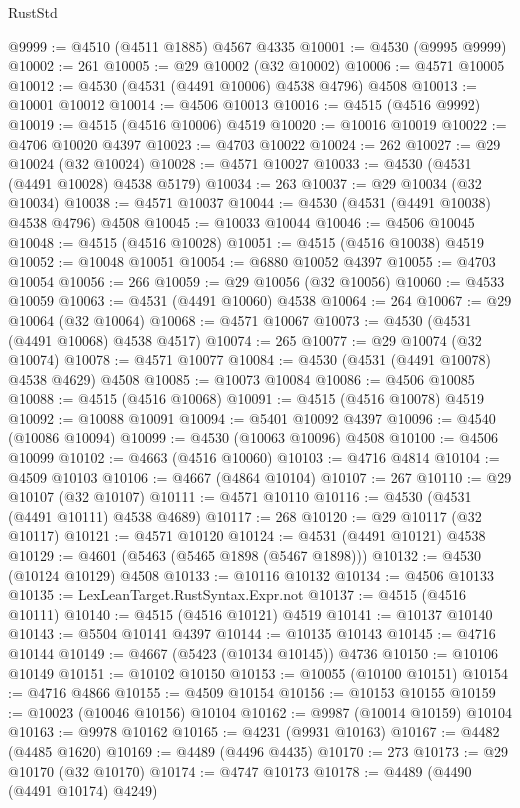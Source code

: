 \begin{lexlean}{RustStd}
\begin{coremodule}
{\begin{coremodule}
{{{{{{{{{{{{{{{{{{{{{{{{{{{{{{{{{{{{{{{{{{{{{{{{{{{{{{{@9999 := @4510 (@4511 @1885) @4567 @4335
@10001 := @4530 (@9995 @9999)
@10002 := 261
@10005 := @29 @10002 (@32 @10002)
@10006 := @4571 @10005
@10012 := @4530 (@4531 (@4491 @10006) @4538 @4796) @4508
@10013 := @10001 @10012
@10014 := @4506 @10013
@10016 := @4515 (@4516 @9992)
@10019 := @4515 (@4516 @10006) @4519
@10020 := @10016 @10019
@10022 := @4706 @10020 @4397
@10023 := @4703 @10022
@10024 := 262
@10027 := @29 @10024 (@32 @10024)
@10028 := @4571 @10027
@10033 := @4530 (@4531 (@4491 @10028) @4538 @5179)
@10034 := 263
@10037 := @29 @10034 (@32 @10034)
@10038 := @4571 @10037
@10044 := @4530 (@4531 (@4491 @10038) @4538 @4796) @4508
@10045 := @10033 @10044
@10046 := @4506 @10045
@10048 := @4515 (@4516 @10028)
@10051 := @4515 (@4516 @10038) @4519
@10052 := @10048 @10051
@10054 := @6880 @10052 @4397
@10055 := @4703 @10054
@10056 := 266
@10059 := @29 @10056 (@32 @10056)
@10060 := @4533 @10059
@10063 := @4531 (@4491 @10060) @4538
@10064 := 264
@10067 := @29 @10064 (@32 @10064)
@10068 := @4571 @10067
@10073 := @4530 (@4531 (@4491 @10068) @4538 @4517)
@10074 := 265
@10077 := @29 @10074 (@32 @10074)
@10078 := @4571 @10077
@10084 := @4530 (@4531 (@4491 @10078) @4538 @4629) @4508
@10085 := @10073 @10084
@10086 := @4506 @10085
@10088 := @4515 (@4516 @10068)
@10091 := @4515 (@4516 @10078) @4519
@10092 := @10088 @10091
@10094 := @5401 @10092 @4397
@10096 := @4540 (@10086 @10094)
@10099 := @4530 (@10063 @10096) @4508
@10100 := @4506 @10099
@10102 := @4663 (@4516 @10060)
@10103 := @4716 @4814
@10104 := @4509 @10103
@10106 := @4667 (@4864 @10104)
@10107 := 267
@10110 := @29 @10107 (@32 @10107)
@10111 := @4571 @10110
@10116 := @4530 (@4531 (@4491 @10111) @4538 @4689)
@10117 := 268
@10120 := @29 @10117 (@32 @10117)
@10121 := @4571 @10120
@10124 := @4531 (@4491 @10121) @4538
@10129 := @4601 (@5463 (@5465 @1898 (@5467 @1898)))
@10132 := @4530 (@10124 @10129) @4508
@10133 := @10116 @10132
@10134 := @4506 @10133
@10135 := LexLeanTarget.RustSyntax.Expr.not
@10137 := @4515 (@4516 @10111)
@10140 := @4515 (@4516 @10121) @4519
@10141 := @10137 @10140
@10143 := @5504 @10141 @4397
@10144 := @10135 @10143
@10145 := @4716 @10144
@10149 := @4667 (@5423 (@10134 @10145)) @4736
@10150 := @10106 @10149
@10151 := @10102 @10150
@10153 := @10055 (@10100 @10151)
@10154 := @4716 @4866
@10155 := @4509 @10154
@10156 := @10153 @10155
@10159 := @10023 (@10046 @10156) @10104
@10162 := @9987 (@10014 @10159) @10104
@10163 := @9978 @10162
@10165 := @4231 (@9931 @10163)
@10167 := @4482 (@4485 @1620)
@10169 := @4489 (@4496 @4435)
@10170 := 273
@10173 := @29 @10170 (@32 @10170)
@10174 := @4747 @10173
@10178 := @4489 (@4490 (@4491 @10174) @4249)
}}}}}}}}}}}}}}}}}}}}}}}}}}}}}}}}}}}}}}}}}}}}}}}}}}}}}}}
\end{coremodule}}
\end{coremodule}
\end{lexlean}
